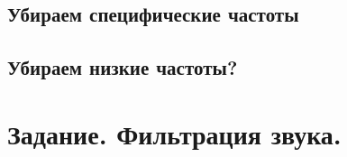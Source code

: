 \documentclass[a5paper, 10pt]{article}
\theoremstyle{definition}
\theoremstyle{plain}
\theoremstyle{remark}
\begin{document}
\subsection{Убираем специфические частоты}










\subsection{Убираем низкие частоты?}





\newpage
\section{Задание. Фильтрация звука.}



\end{document}
